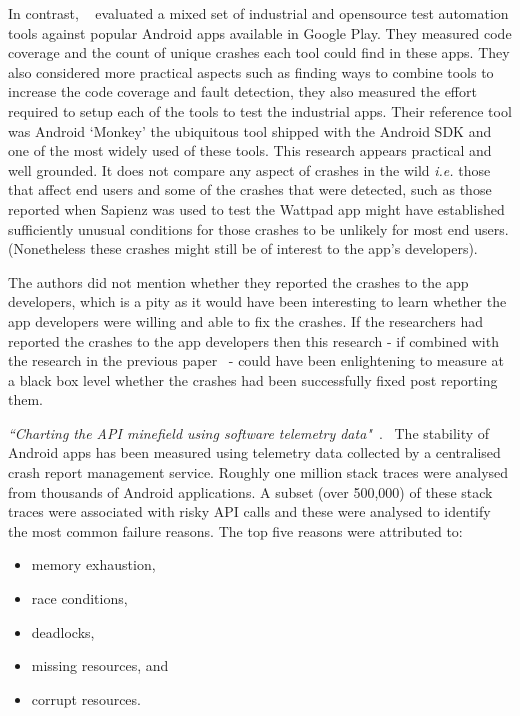 In contrast, ~ evaluated a mixed set of industrial and opensource test automation tools against popular Android apps available in Google Play. They measured code coverage and the count of unique crashes each tool could find in these apps. They also considered more practical aspects such as finding ways to combine tools to increase the code coverage and fault detection, they also measured the effort required to setup each of the tools to test the industrial apps. Their reference tool was Android `Monkey' the ubiquitous tool shipped with the Android SDK and one of the most widely used of these tools. This research appears practical and well grounded. It does not compare any aspect of crashes in the wild \emph{i.e.} those that affect end users and some of the crashes that were detected, such as those reported when Sapienz was used to test the Wattpad app might have established sufficiently unusual conditions for those crashes to be unlikely for most end users. (Nonetheless these crashes might still be of interest to the app's developers). 

The authors did not mention whether they reported the crashes to the app developers, which is a pity as it would have been interesting to learn whether the app developers were willing and able to fix the crashes. If the researchers had reported the crashes to the app developers then this research - if combined with the research in the previous paper~ - could have been enlightening to measure at a black box level whether the crashes had been successfully fixed post reporting them.

\emph{``Charting the API minefield using software telemetry data"}~.~ The stability of Android apps has been measured using telemetry data collected by a centralised crash report management service. Roughly one million stack traces were analysed from thousands of Android applications. A subset (over 500,000) of these stack traces were associated with risky API calls and these were analysed to identify the most common failure reasons. The top five reasons were attributed to:
    \begin{itemize}
        \item memory exhaustion,
        \item race conditions,
        \item deadlocks,
        \item missing resources, and
        \item corrupt resources.
    \end{itemize}
    

